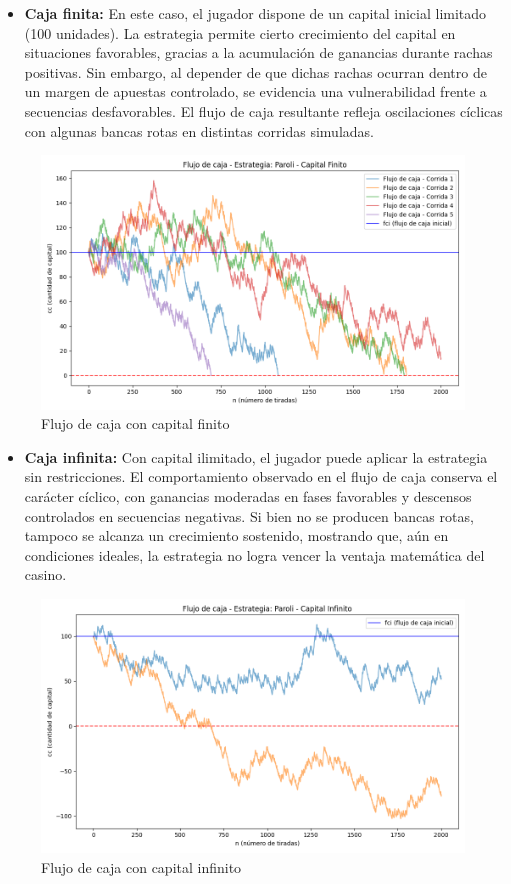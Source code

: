 \documentclass{article}
\begin{document}
\begin{itemize}
    \item \textbf{Caja finita:} En este caso, el jugador dispone de un capital inicial limitado (100 unidades). La estrategia permite cierto crecimiento del capital en situaciones favorables, gracias a la acumulación de ganancias durante rachas positivas. Sin embargo, al depender de que dichas rachas ocurran dentro de un margen de apuestas controlado, se evidencia una vulnerabilidad frente a secuencias desfavorables. El flujo de caja resultante refleja oscilaciones cíclicas con algunas bancas rotas en distintas corridas simuladas.
\end{itemize}
\begin{figure}[H]
    \centering
    \includegraphics[width=0.7\linewidth]{Imagenes/flujo_caja_Paroli_f.png}
    \caption{Flujo de caja con capital finito}
    \label{fig:paroli_finita}
\end{figure}

\begin{itemize}
    \item \textbf{Caja infinita:}  Con capital ilimitado, el jugador puede aplicar la estrategia sin restricciones. El comportamiento observado en el flujo de caja conserva el carácter cíclico, con ganancias moderadas en fases favorables y descensos controlados en secuencias negativas. Si bien no se producen bancas rotas, tampoco se alcanza un crecimiento sostenido, mostrando que, aún en condiciones ideales, la estrategia no logra vencer la ventaja matemática del casino. 
\end{itemize}
    
\begin{figure}[H]
    \centering
    \includegraphics[width=0.7\linewidth]{Imagenes/flujo_caja_Paroli_i.png}
    \caption{Flujo de caja con capital infinito}
    \label{fig:paroli_inf}
\end{figure}        
\end{document}
